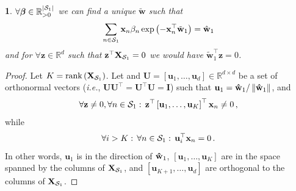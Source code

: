 \documentclass[twoside,11pt,english]{article}
\newtheorem{lem}[thm]{\protect\lemmaname}
\providecommand{\lemmaname}{Lemma}
\providecommand{\lemmaname}{Lemma}
\begin{document}
\begin{lem}
$\forall\boldsymbol{\beta}\in\mathbb{R}_{>0}^{\left|\mathcal{S}_{1}\right|}$ we can find a unique $\tilde{\mathbf{w}}$ such that 
\begin{equation}
\sum_{n\in\mathcal{S}_{1}}\mathbf{x}_{n}\beta_{n}\exp\left(-\mathbf{x}_{n}^{\top}\tilde{\mathbf{w}}_{1}\right)=\hat{\mathbf{w}}_{1}\label{eq: w_tilde equation}
\end{equation}
and for $\forall\mathbf{z}\in\mathbb{R}^{d}$ such that $\mathbf{z}^{\top}\mathbf{X}_{\mathcal{S}_{1}}=0$
we would have $\tilde{\mathbf{w}}_{1}^{\top}\mathbf{z}=0$.\label{lem: existence of solutions} 
\end{lem}

\begin{proof}
Let $K=\mathrm{rank}\left(\mathbf{X}_{\mathcal{S}_{1}}\right)$. Let and $\mathbf{U}=\left[\mathbf{u}_{1},\dots,\mathbf{u}_{d}\right]\in\mathbb{R}^{d\times d}$
be a set of orthonormal vectors (\emph{i.e.}, \textbf{$\mathbf{U}\mathbf{U}^{\top}=\mathbf{U}^{\top}\mathbf{U}=\mathbf{I}$})
such that $\mathbf{u}_{1}=\mathbf{\hat{\mathbf{w}}}_{1}/\left\Vert \mathbf{\hat{\mathbf{w}}}_{1}\right\Vert $,
and 
\begin{equation}
\forall\mathbf{z}\neq0,\forall n\in\mathcal{S}_{1}:\,\mathbf{z}^{\top}\left[\mathbf{u}_{1},\dots,\mathbf{u}_{K}\right]^{\top}\mathbf{x}_{n}\neq0\,,\label{eq: v no zero eigen value}
\end{equation}
while 
\begin{equation}
\forall i>K:\,\forall n\in\mathcal{S}_{1}:\,\mathbf{u}_{i}^{\top}\mathbf{x}_{n}=0\,.\label{eq: null space}
\end{equation}
In other words, $\mathbf{u}_{1}$ is in the direction of $\mathbf{\hat{\mathbf{w}}}_{1}$,
$\left[\mathbf{u}_{1},\dots,\mathbf{u}_{K}\right]$ are in the space
spanned by the columns of $\mathbf{X}_{\mathcal{S}_{1}}$, and $\left[\mathbf{u}_{K+1},\dots,\mathbf{u}_{d}\right]$
are orthogonal to the columns of $\mathbf{X}_{\mathcal{S}_{1}}$.


\end{proof}
\end{document}
